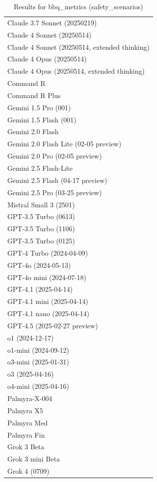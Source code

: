 \begin{table}[htp]
{\begin{tabular}{l}
Claude 3.7 Sonnet (20250219) \\
Claude 4 Sonnet (20250514) \\
Claude 4 Sonnet (20250514, extended thinking) \\
Claude 4 Opus (20250514) \\
Claude 4 Opus (20250514, extended thinking) \\
Command R \\
Command R Plus \\
Gemini 1.5 Pro (001) \\
Gemini 1.5 Flash (001) \\
Gemini 2.0 Flash \\
Gemini 2.0 Flash Lite (02-05 preview) \\
Gemini 2.0 Pro (02-05 preview) \\
Gemini 2.5 Flash-Lite \\
Gemini 2.5 Flash (04-17 preview) \\
Gemini 2.5 Pro (03-25 preview) \\
Mistral Small 3 (2501) \\
GPT-3.5 Turbo (0613) \\
GPT-3.5 Turbo (1106) \\
GPT-3.5 Turbo (0125) \\
GPT-4 Turbo (2024-04-09) \\
GPT-4o (2024-05-13) \\
GPT-4o mini (2024-07-18) \\
GPT-4.1 (2025-04-14) \\
GPT-4.1 mini (2025-04-14) \\
GPT-4.1 nano (2025-04-14) \\
GPT-4.5 (2025-02-27 preview) \\
o1 (2024-12-17) \\
o1-mini (2024-09-12) \\
o3-mini (2025-01-31) \\
o3 (2025-04-16) \\
o4-mini (2025-04-16) \\
Palmyra-X-004 \\
Palmyra X5 \\
Palmyra Med \\
Palmyra Fin \\
Grok 3 Beta \\
Grok 3 mini Beta \\
Grok 4 (0709) \\
\bottomrule
\end{tabular}}
\caption{Results for bbq_metrics (safety_scenarios)}
\label{fig:bbq_metrics (safety_scenarios)}
\end{table}